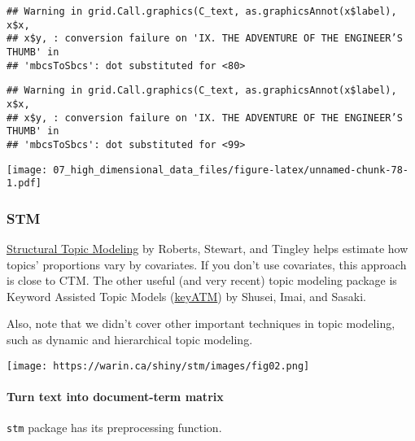 \documentclass[
]{book}
\newenvironment{Shaded}{\begin{snugshade}}{\end{snugshade}}
\newcommand{\DataTypeTok}[1]{\textcolor[rgb]{0.13,0.29,0.53}{#1}}
\newcommand{\KeywordTok}[1]{\textcolor[rgb]{0.13,0.29,0.53}{\textbf{#1}}}
\newcommand{\NormalTok}[1]{#1}
\newcommand{\OperatorTok}[1]{\textcolor[rgb]{0.81,0.36,0.00}{\textbf{#1}}}
\newcommand{\OtherTok}[1]{\textcolor[rgb]{0.56,0.35,0.01}{#1}}
\newcommand{\StringTok}[1]{\textcolor[rgb]{0.31,0.60,0.02}{#1}}
\begin{document}
\begin{verbatim}
## Warning in grid.Call.graphics(C_text, as.graphicsAnnot(x$label), x$x,
## x$y, : conversion failure on 'IX. THE ADVENTURE OF THE ENGINEER’S THUMB' in
## 'mbcsToSbcs': dot substituted for <80>
\end{verbatim}

\begin{verbatim}
## Warning in grid.Call.graphics(C_text, as.graphicsAnnot(x$label), x$x,
## x$y, : conversion failure on 'IX. THE ADVENTURE OF THE ENGINEER’S THUMB' in
## 'mbcsToSbcs': dot substituted for <99>
\end{verbatim}

\texttt{[image: 07\_high\_dimensional\_data\_files/figure-latex/unnamed-chunk-78-1.pdf]}

\hypertarget{stm}{%
\subsubsection{STM}\label{stm}}

\href{https://www.structuraltopicmodel.com/}{Structural Topic Modeling} by Roberts, Stewart, and Tingley helps estimate how topics' proportions vary by covariates. If you don't use covariates, this approach is close to CTM. The other useful (and very recent) topic modeling package is Keyword Assisted Topic Models (\href{https://keyatm.github.io/keyATM/}{keyATM}) by Shusei, Imai, and Sasaki.

Also, note that we didn't cover other important techniques in topic modeling, such as dynamic and hierarchical topic modeling.

\texttt{[image: https://warin.ca/shiny/stm/images/fig02.png]}

\hypertarget{turn-text-into-document-term-matrix}{%
\paragraph{Turn text into document-term matrix}\label{turn-text-into-document-term-matrix}}

\texttt{stm} package has its preprocessing function.

\begin{Shaded}
\end{Shaded}
\end{document}
